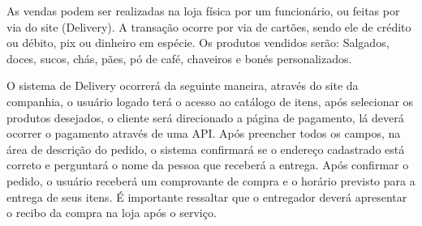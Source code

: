 As vendas podem ser realizadas na loja física por um funcionário, ou feitas por via do site (Delivery). A transação ocorre por via de cartões, sendo ele de crédito ou débito, pix ou dinheiro em espécie. Os produtos vendidos serão: Salgados, doces, sucos, chás, pães, pó de café, chaveiros e bonés personalizados.

O sistema de Delivery ocorrerá da seguinte maneira, através do site da companhia, o usuário logado terá o acesso ao catálogo de itens, após selecionar os produtos desejados, o cliente será direcionado a página de pagamento, lá deverá ocorrer o pagamento através de uma API. Após preencher todos os campos, na área de descrição do pedido, o sistema confirmará se o endereço cadastrado está correto e perguntará o nome da pessoa que receberá a entrega. Após confirmar o pedido, o usuário receberá um comprovante de compra e o horário previsto para a entrega de seus itens. É importante ressaltar que o entregador deverá apresentar o recibo da compra na loja após o serviço.